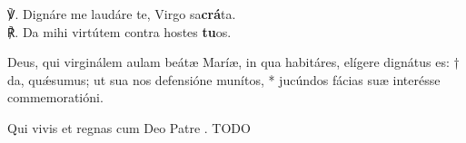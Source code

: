 

\label{prima}

\vspace{1cm}

\deusInAdiutorium

\vfill

\pagebreak




\antiphonaLaudI











\noindent ℣. Dignáre me laudáre te, Virgo sa\textbf{crá}ta.\\
℟. Da mihi virtútem contra hostes \textbf{tu}os.

\finisHoraeMinores


Deus, qui virginálem aulam beátæ Maríæ, in qua habitáres,
elígere dignátus es: †
da, quǽsumus; ut sua nos defensióne munítos, *
jucúndos fácias suæ interésse commemoratióni.

Qui vivis et regnas cum Deo Patre . TODO

\vfill
